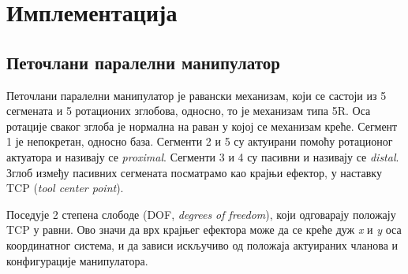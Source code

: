 \documentclass[12pt]{article}
\begin{document}

\section{Имплементација}


\subsection{Петочлани паралелни манипулатор}
Петочлани паралелни манипулатор је равански механизам, који се састоји из 5 сегмената и 5 ротационих зглобова, односно, то је механизам типа 5R. Оса ротације сваког зглоба је нормална на раван у којој се механизам креће. Сегмент 1 је непокретан, односно база. Сегменти 2 и 5 су актуирани помоћу ротационог актуатора и називају се \textit{proximal}. Сегменти 3 и 4 су пасивни и називају се \textit{distal}. Зглоб између пасивних сегмената посматрамо као крајњи ефектор, у наставку TCP (\textit{tool center point}).

 Поседује 2 степена слободе (DOF, \textit{degrees of freedom}), који одговарају положају TCP у равни. Ово значи да врх крајњег ефектора може да се креће дуж \textit{x} и \textit{y} оса координатног система, и да зависи искључиво од положаја актуираних чланова и конфигурације манипулатора.
\end{document}
